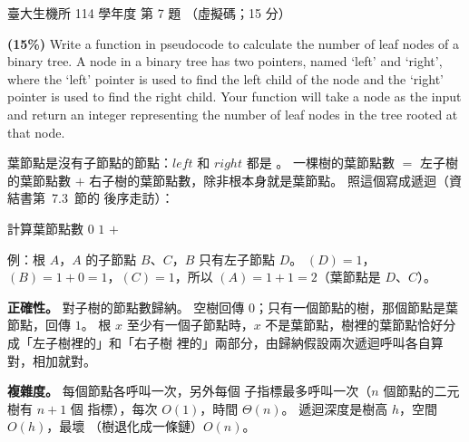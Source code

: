 \begin{pastexam}[label={px:ntu-114-bime-ds-07}]{臺大生機所 114 學年度 第 7 題}
（虛擬碼；15 分）

\textbf{(15\%)} Write a function in pseudocode to calculate the number of leaf nodes of a binary
tree. A node in a binary tree has two pointers, named `left' and `right', where the `left' pointer is
used to find the left child of the node and the `right' pointer is used to find the right child.
Your function will take a node as the input and return an integer representing the number of leaf
nodes in the tree rooted at that node.
\end{pastexam}

\begin{pastsoln}
葉節點是沒有子節點的節點：$\mathit{left}$ 和 $\mathit{right}$ 都是 \NIL。 一棵樹的葉節點數 $=$
左子樹的葉節點數 $+$ 右子樹的葉節點數，除非根本身就是葉節點。 照這個寫成遞迴（資結書第~7.3~節的
後序走訪）：

\begin{pseudo}{計算葉節點數}
        \State \Return $0$ 
    \EndIf
        \State \Return $1$ 
    \EndIf
    \State \Return {} $+$ 
\EndFunction
\end{pseudo}

例：根 $A$，$A$ 的子節點 $B$、$C$，$B$ 只有左子節點 $D$。 $(D) = 1$，
$(B) = 1 + 0 = 1$，$(C) = 1$，所以
$(A) = 1 + 1 = 2$（葉節點是 $D$、$C$）。

\textbf{正確性。} 對子樹的節點數歸納。 空樹回傳 $0$；只有一個節點的樹，那個節點是葉節點，回傳
$1$。 根 $x$ 至少有一個子節點時，$x$ 不是葉節點，樹裡的葉節點恰好分成「左子樹裡的」和「右子樹
裡的」兩部分，由歸納假設兩次遞迴呼叫各自算對，相加就對。

\textbf{複雜度。} 每個節點各呼叫一次，另外每個 \NIL 子指標最多呼叫一次（$n$ 個節點的二元樹有
$n + 1$ 個 \NIL 指標），每次 $O(1)$，時間 $\Theta(n)$。 遞迴深度是樹高 $h$，空間 $O(h)$，最壞
（樹退化成一條鏈）$O(n)$。
\end{pastsoln}
